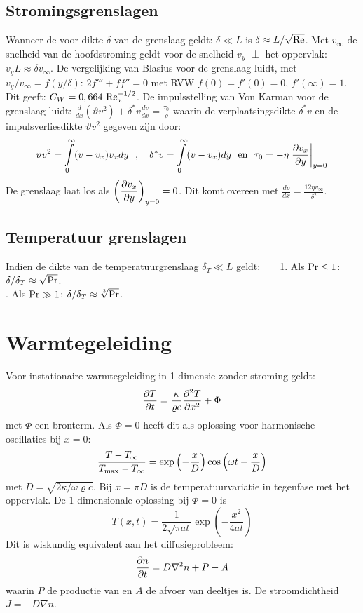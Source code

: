 \documentclass[twoside]{report}
\begin{document}
\subsection{Stromingsgrenslagen}
Wanneer de voor dikte $\delta$ van de grenslaag geldt: $\delta\ll L$ is
$\delta\approx L/\sqrt{\rm Re}$. Met $v_\infty$ de snelheid van de
hoofdstroming geldt voor de snelheid $v_y$ $\perp$ het oppervlak:
$v_yL\approx\delta v_\infty$. De vergelijking van Blasius voor de
grenslaag luidt, met $v_y/v_\infty=f(y/\delta)$: $2f'''+ff''=0$ met RVW
$f(0)=f'(0)=0$, $f'(\infty)=1$. Dit geeft: $C_W=0,664~{\rm Re}_x^{-1/2}$.
\npar
De impulsstelling van Von Karman voor de grenslaag luidt:
$\displaystyle
\frac{d}{dx}(\vartheta v^2)+\delta^* v\frac{dv}{dx}=\frac{\tau_0}{\varrho}
$
\npar
waarin de verplaatsingsdikte $\delta^*v$ en de impulsverliesdikte
$\vartheta v^2$ gegeven zijn door:
\[
\vartheta v^2=\int\limits_0^\infty (v-v_x)v_xdy~~,~~~
\delta^*v=\int\limits_0^\infty (v-v_x)dy~~\mbox{en}~~
\tau_0=-\eta\left.\frac{\partial v_x}{\partial y}\right|_{y=0}
\]
De grenslaag laat los als $\displaystyle\left(\frac{\partial v_x}{\partial y}\right)_{y=0}=0$. Dit komt
overeen met $\displaystyle\frac{dp}{dx}=\frac{12\eta v_\infty}{\delta^2}$.

\subsection{Temperatuur grenslagen}
\begin{tabbing}
Indien de dikte van de temperatuurgrenslaag $\delta_T\ll L$ geldt:~~~~\=
  1. Als ${\rm Pr}\leq1$: $\delta/\delta_T\approx\sqrt{\rm Pr}$.\\
. Als ${\rm Pr}\gg1$: $\delta/\delta_T\approx\sqrt[3]{\rm Pr}$.
\end{tabbing}

\section{Warmtegeleiding}
Voor instationaire warmtegeleiding in 1 dimensie zonder stroming geldt:
\[
\frac{\partial T}{\partial t}=\frac{\kappa}{\varrho c}\frac{\partial^2 T}{\partial x^2}+\Phi
\]
met $\Phi$ een bronterm. Als $\Phi=0$ heeft dit als oplossing voor
harmonische oscillaties bij $x=0$:
\[
\frac{T-T_\infty}{T_{\rm max}-T_\infty}=\exp\left(-\frac{x}{D}\right)\cos\left(\omega t-\frac{x}{D}\right)
\]
met $D=\sqrt{2\kappa/\omega\varrho c}$. Bij $x=\pi D$ is de temperatuurvariatie in
tegenfase met het oppervlak. De 1-dimensionale oplossing bij $\Phi=0$ is
\[
T(x,t)=\frac{1}{2\sqrt{\pi at}}\exp\left(-\frac{x^2}{4at}\right)
\]
Dit is wiskundig equivalent aan het diffusieprobleem:
\[
\frac{\partial n}{\partial t}=D\nabla^2n+P-A
\]
waarin $P$ de productie van en $A$ de afvoer van deeltjes is. De
stroomdichtheid $J=-D\nabla n$.
\end{document}
